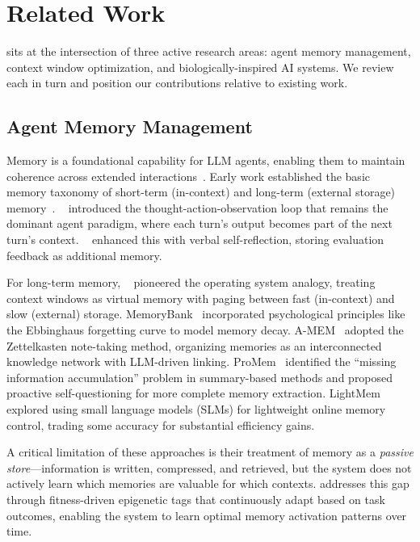 \section{Related Work}

\EpiContext{} sits at the intersection of three active research areas: agent memory management, context window optimization, and biologically-inspired AI systems. We review each in turn and position our contributions relative to existing work.

\subsection{Agent Memory Management}

Memory is a foundational capability for LLM agents, enabling them to maintain coherence across extended interactions~\citep{wang2024survey, hu2025survey}. Early work established the basic memory taxonomy of short-term (in-context) and long-term (external storage) memory~\citep{park2023generative}. \ReAct{}~\citep{yao2023react} introduced the thought-action-observation loop that remains the dominant agent paradigm, where each turn's output becomes part of the next turn's context. \Reflexion{}~\citep{shinn2023reflexion} enhanced this with verbal self-reflection, storing evaluation feedback as additional memory.

For long-term memory, \MemGPT{}~\citep{packer2023memgpt} pioneered the operating system analogy, treating context windows as virtual memory with paging between fast (in-context) and slow (external) storage. MemoryBank~\citep{zhong2024memorybank} incorporated psychological principles like the Ebbinghaus forgetting curve to model memory decay. A-MEM~\citep{xu2025amem} adopted the Zettelkasten note-taking method, organizing memories as an interconnected knowledge network with LLM-driven linking. ProMem~\citep{chen2025promem} identified the ``missing information accumulation'' problem in summary-based methods and proposed proactive self-questioning for more complete memory extraction. LightMem~\citep{sinha2025lightmem} explored using small language models (SLMs) for lightweight online memory control, trading some accuracy for substantial efficiency gains.

A critical limitation of these approaches is their treatment of memory as a \textit{passive store}---information is written, compressed, and retrieved, but the system does not actively learn which memories are valuable for which contexts. \EpiContext{} addresses this gap through fitness-driven epigenetic tags that continuously adapt based on task outcomes, enabling the system to learn optimal memory activation patterns over time.


